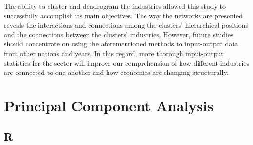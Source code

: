 \documentclass[10pt,towside,a4paper]{article}
\begin{document}
	 The ability to cluster and dendrogram the industries allowed this study to successfully accomplish its main objectives. The way the networks are presented reveals the interactions and connections among the clusters' hierarchical positions and the connections between the clusters' industries. However, future studies should concentrate on using the aforementioned methods to input-output data from other nations and years. In this regard, more thorough input-output statistics for the sector will improve our comprehension of how different industries are connected to one another and how economies are changing structurally.
	 
	 \newpage
	 
	 \section{Principal Component Analysis}
	 \subsection{R}
	 
\end{document}
